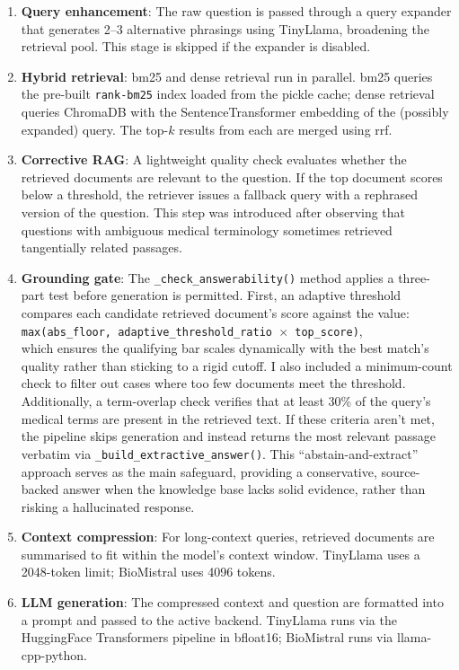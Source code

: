 \begin{enumerate}
    \item \textbf{Query enhancement}: The raw question is passed through a query expander that generates 2--3 alternative phrasings using TinyLlama, broadening the retrieval pool. This stage is skipped if the expander is disabled.
    \item \textbf{Hybrid retrieval}: \ac{bm25} and dense retrieval run in parallel. \ac{bm25} queries the pre-built \texttt{rank-bm25} index loaded from the pickle cache; dense retrieval queries ChromaDB with the SentenceTransformer embedding of the (possibly expanded) query. The top-$k$ results from each are merged using \ac{rrf}.
    \item \textbf{Corrective RAG}: A lightweight quality check evaluates whether the retrieved documents are relevant to the question. If the top document scores below a threshold, the retriever issues a fallback query with a rephrased version of the question. This step was introduced after observing that questions with ambiguous medical terminology sometimes retrieved tangentially related passages.
    \item \textbf{Grounding gate}: The \texttt{\_check\_answerability()} method applies a three-part test before generation is permitted. First, an adaptive threshold compares each candidate retrieved document's score against the value: \\ \texttt{max(abs\_floor,\allowbreak{} adaptive\_threshold\_ratio $\times$ top\_score)}, \\ which ensures the qualifying bar scales dynamically with the best match's quality rather than sticking to a rigid cutoff. I also included a minimum-count check to filter out cases where too few documents meet the threshold. Additionally, a term-overlap check verifies that at least 30\% of the query's medical terms are present in the retrieved text. If these criteria aren't met, the pipeline skips generation and instead returns the most relevant passage verbatim via \texttt{\_build\_extractive\_answer()}. This ``abstain-and-extract'' approach serves as the main safeguard, providing a conservative, source-backed answer when the knowledge base lacks solid evidence, rather than risking a hallucinated response.
    \item \textbf{Context compression}: For long-context queries, retrieved documents are summarised to fit within the model's context window. TinyLlama uses a 2048-token limit; BioMistral uses 4096 tokens.
    \item \textbf{LLM generation}: The compressed context and question are formatted into a prompt and passed to the active backend. TinyLlama runs via the HuggingFace Transformers pipeline in bfloat16; BioMistral runs via llama-cpp-python.

\end{enumerate}
